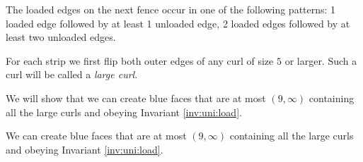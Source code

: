 \begin{invariants}
  \label{inv:uni:load}
  \item The loaded edges on the next fence occur in one of the following patterns: 1 loaded edge followed by at least 1 unloaded edge, 2 loaded edges followed by at least two unloaded edges.

  \setcounter{invar}{1}
\end{invariants}

For each strip we first flip both outer edges of any curl of size $5$ or larger. Such a curl will be called a \emph{large curl}.

We will show that we can create blue faces that are at most $(9, \infty)$ containing all the large curls and obeying Invariant \ref{inv:uni:load}.

\begin{lemma}
  \label{lm:uni:removingLargeCurls}
  We can create blue faces that are at most $(9, \infty)$ containing all the large curls and obeying Invariant \ref{inv:uni:load}.
\end{lemma}


